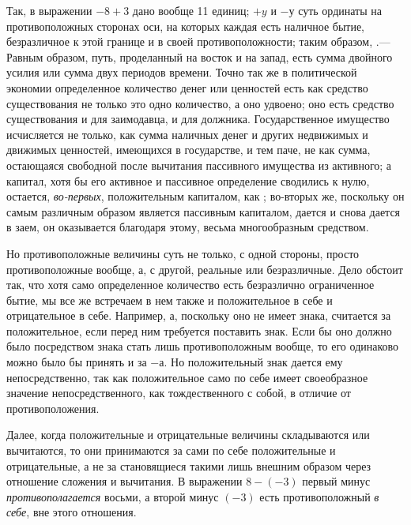 Так, в выражении  $-8+3$ дано вообще 11 единиц;
$+y$ и $-у$ суть
ординаты на противоположных сторонах оси, на которых каждая есть наличное
бытие, безразличное к этой границе и в своей противоположности; таким
образом, .— Равным образом, путь, проделанный на восток и на запад, есть
сумма двойного усилия или сумма двух периодов времени. Точно так же в
политической экономии определенное количество денег или ценностей есть как
средство существования не только это одно количество, а оно удвоено; оно
есть средство существования и для заимодавца, и для должника.
Государственное имущество исчисляется не только, как сумма наличных денег и
других недвижимых и движимых ценностей, имеющихся в государстве, и тем
паче, не как сумма, остающаяся свободной после вычитания пассивного
имущества из активного; а капитал, хотя бы его активное и пассивное
определение сводились к нулю, остается,
{\em во-первых}, положительным капиталом, как ;
во-вторых же, поскольку он самым различным образом является пассивным
капиталом, дается и снова дается в заем, он оказывается благодаря этому,
весьма многообразным средством.

Но противоположные величины суть не только, с одной стороны, просто
противоположные вообще, а, с другой, реальные или безразличные. Дело
обстоит так, что хотя само определенное количество есть безразлично
ограниченное бытие, мы все же встречаем в нем также и положительное в себе
и отрицательное в себе. Например, $а$, поскольку
оно не имеет знака, считается за положительное, если перед ним требуется
поставить знак. Если бы оно должно было посредством знака стать лишь
противоположным вообще, то его одинаково можно было бы принять и за 
$-а$. Но положительный знак дается ему
непосредственно, так как положительное само по себе имеет своеобразное
значение непосредственного, как тождественного с собой, в отличие от
противоположения.

Далее, когда положительные и отрицательные величины складываются или
вычитаются, то они принимаются за сами по себе положительные и
отрицательные, а не за становящиеся такими лишь внешним образом через
отношение сложения и вычитания. В выражении $8-(-3)$ первый минус
{\em противополагается} восьми, а второй минус $(-3)$
есть противоположный {\em в себе}, вне этого отношения.

